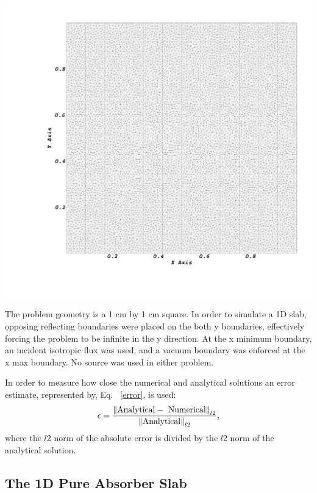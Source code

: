 \noindent\begin{minipage}{\textwidth}
\centering
\includegraphics[scale = 0.12,trim = 10cm 10cm 0cm 0cm ]{figures/solutionmesh.png}
\label{verificationgeometry}
\end{minipage}
\smallskip

The problem geometry is a 1 cm by 1 cm square. In order to simulate a 1D slab, opposing reflecting boundaries were placed on the both y boundaries, effectively forcing the problem to be infinite in the y direction. At the x minimum boundary, an incident isotropic flux was used, and a vacuum boundary was enforced at the x max boundary. No source was used in either problem.

In order to measure how close the numerical and analytical solutions an error estimate, represented by, Eq. ~\eqref{error}, is used:
\begin{equation}
\epsilon = \frac{\left\lVert\text{Analytical} - \text{ Numerical}\right\rVert_{l2}}{\left\lVert\text{Analytical}\right\rVert_{l2}},
\label{error}
\end{equation}
where the $l2$ norm of the absolute error is divided by the $l2$ norm of the analytical solution.

\subsection{The 1D Pure Absorber Slab}

